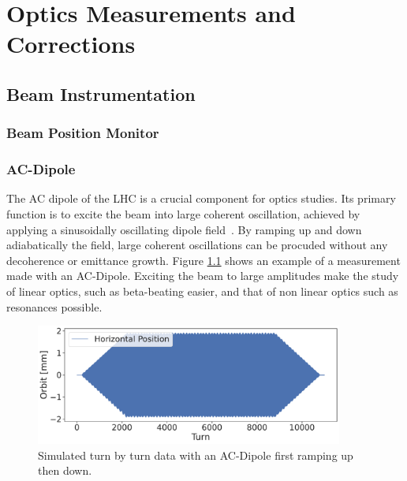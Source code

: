 \chapter{Optics Measurements and Corrections}
\thumbforchapter{}
\chaptertoc{}

\section{Beam Instrumentation}


\subsection{Beam Position Monitor}



\subsection{AC-Dipole}

The AC dipole of the LHC is a crucial component for optics studies. Its primary function is to excite the beam into large coherent oscillation, achieved by applying a sinusoidally oscillating dipole field~\cite{miyamoto_parametrization_2008}. By ramping up and down adiabatically the field, large coherent oscillations can be procuded without any decoherence or emittance growth. Figure \ref{fig:ac_dipole} shows an example 
of a measurement made with an AC-Dipole.
Exciting the beam to large amplitudes make the study of linear optics, such as beta-beating easier, and that of non linear optics such as resonances possible.

\begin{figure}[H]
    \center
    \includegraphics[width=0.9\textwidth]{chapters/03_Optics_Measurements_Corrections/images/ac_dipole_tbt.pdf}
    \caption{Simulated turn by turn data with an AC-Dipole first ramping up then down.} 
    \label{fig:ac_dipole}
\end{figure}

